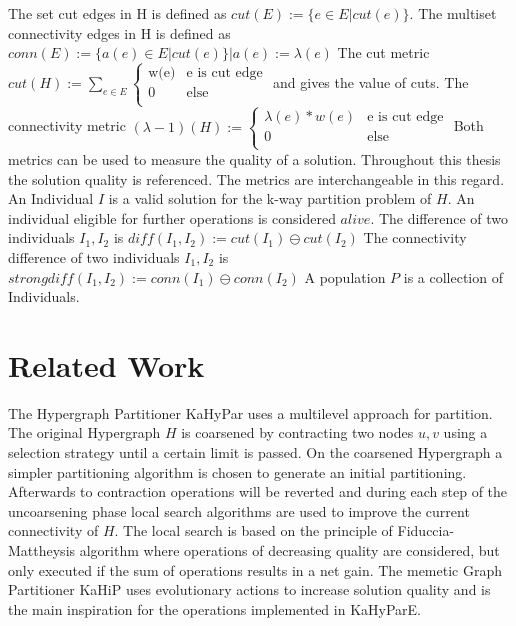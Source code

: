 \documentclass[a4paper,12pt,bibtotoc,titlepage, liststotoc,BCOR7mm,headsepline,pointlessnumbers]{scrbook}
\numberwithin{equation}{section}
\begin{document}
The set cut edges in H is defined as
$cut(E) := \{e \in E | cut(e) \}$.
The multiset connectivity edges in H is defined as
$conn(E) := \{a(e) \in E | cut(e) \} |a(e) := \lambda(e)$
The cut metric $cut(H) := \sum_{e \in E} 
\begin{cases}
       \text{w(e)} & \text{e is cut edge}\\
       \text{0} &\text{else}\\
     \end{cases}$  and gives the value of cuts.
The connectivity metric $(\lambda -1)(H) := \begin{cases}
       \text{$\lambda(e)*w(e)$} & \text{e is cut edge}\\
       \text{0} &\text{else}\\
     \end{cases}$
Both metrics can be used to measure the quality of a solution. Throughout this thesis the solution quality is referenced. The metrics are interchangeable in this regard.
An Individual $I$ is a valid solution for the k-way partition problem of $H$.
An individual eligible for further operations is considered $alive$.
The difference of two individuals $I_1, I_2$ is $diff(I_1, I_2) := cut(I_1) \ominus cut(I_2)$
The connectivity difference of two individuals $I_1, I_2$ is $strongdiff(I_1, I_2) := conn(I_1) \ominus conn(I_2)$
A population $P$ is a collection of Individuals.

\chapter{Related Work}
The Hypergraph Partitioner KaHyPar uses a multilevel approach for partition. The original Hypergraph $H$ is coarsened by contracting two nodes $u,v$ using 
a selection strategy until a certain limit is passed. %
On the coarsened Hypergraph a simpler partitioning algorithm is chosen to generate an initial partitioning. Afterwards to contraction operations will be reverted and 
during each step of the uncoarsening phase local search algorithms are used to improve the current connectivity of $H$. The local search is based on the principle of
Fiduccia-Mattheysis algorithm where operations of decreasing quality are considered, but only executed if the sum of operations results in a net gain.
\newline
The memetic Graph Partitioner KaHiP uses evolutionary actions to increase solution quality and is the main inspiration for the operations implemented in KaHyParE.
\end{document}
